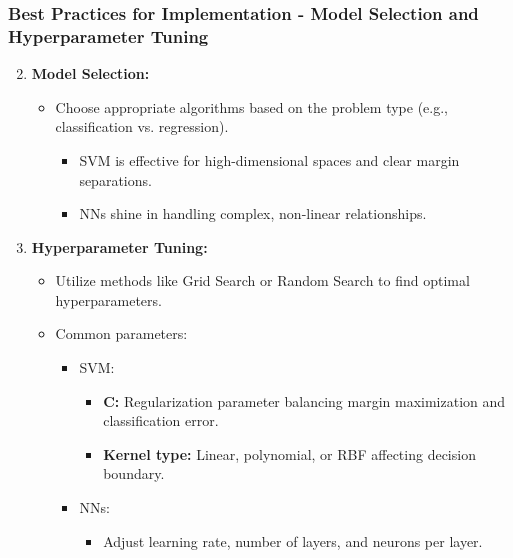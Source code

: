 \documentclass[aspectratio=169]{beamer}
\begin{document}
\begin{frame}[fragile]
    \frametitle{Best Practices for Implementation - Model Selection and Hyperparameter Tuning}
    \begin{enumerate}
        \setcounter{enumi}{1}
        \item \textbf{Model Selection:}
        \begin{itemize}
            \item Choose appropriate algorithms based on the problem type (e.g., classification vs. regression).
            \begin{itemize}
                \item SVM is effective for high-dimensional spaces and clear margin separations.
                \item NNs shine in handling complex, non-linear relationships.
            \end{itemize}
        \end{itemize}
        
        \item \textbf{Hyperparameter Tuning:}
        \begin{itemize}
            \item Utilize methods like Grid Search or Random Search to find optimal hyperparameters.
            \item Common parameters:
            \begin{itemize}
                \item SVM: 
                \begin{itemize}
                    \item \textbf{C:} Regularization parameter balancing margin maximization and classification error.
                    \item \textbf{Kernel type:} Linear, polynomial, or RBF affecting decision boundary.
                \end{itemize}
                \item NNs: 
                \begin{itemize}
                    \item Adjust learning rate, number of layers, and neurons per layer.
                \end{itemize}
            \end{itemize}
        \end{itemize}
    \end{enumerate}
\end{frame}
\end{document}
